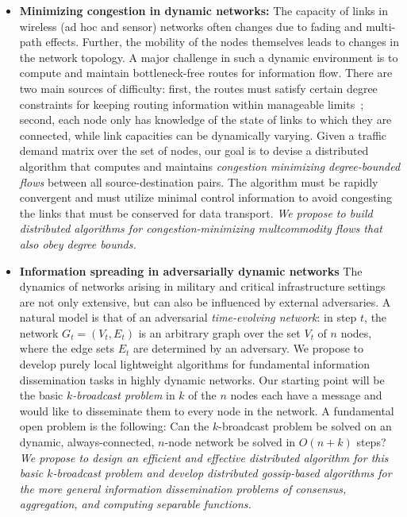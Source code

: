 \begin{itemize}
\item
{\bf Minimizing congestion in dynamic networks:} The capacity of links
in wireless (ad hoc and sensor) networks often changes due to fading
and multi-path effects.  Further, the mobility of the nodes themselves
leads to changes in the network topology.  A major challenge in such a
dynamic environment is to compute and maintain bottleneck-free routes
for information flow.  There are two main sources of difficulty:
first, the routes must satisfy certain degree constraints for keeping
routing information within manageable limits~\cite{chen+rs:flow};
second, each node only has knowledge of the state of links to which
they are connected, while link capacities can be dynamically varying.
Given a traffic demand matrix over the set of nodes, our goal is to
devise a distributed algorithm that computes and maintains {\em
  congestion minimizing degree-bounded flows}\/ between all
source-destination pairs.  The algorithm must be rapidly convergent
and must utilize minimal control information to avoid congesting the
links that must be conserved for data transport. {\em We propose to
  build distributed algorithms for congestion-minimizing multcommodity
  flows that also obey degree bounds.}

\item
{\bf Information spreading in adversarially dynamic networks} The
dynamics of networks arising in military and critical infrastructure
settings are not only extensive, but can also be influenced by
external adversaries.  A natural model is that of an adversarial {\em
  time-evolving network}: in step $t$, the network $G_t = (V_t, E_t)$
is an arbitrary graph over the set $V_t$ of $n$ nodes, where the edge
sets $E_t$ are determined by an adversary.  We propose to develop
purely local lightweight algorithms for fundamental information
dissemination tasks in highly dynamic networks.  Our starting point
will be the basic {\em $k$-broadcast problem} in $k$ of the $n$ nodes
each have a message and would like to disseminate them to every node
in the network.  A fundamental open problem is the following: Can the
$k$-broadcast problem be solved on an dynamic, always-connected,
$n$-node network be solved in $O(n + k)$ steps? {\em We propose to
  design an efficient and effective distributed algorithm for this
  basic $k$-broadcast problem and develop distributed gossip-based
  algorithms for the more general information dissemination problems
  of consensus, aggregation, and computing separable functions.}


\end{itemize}

